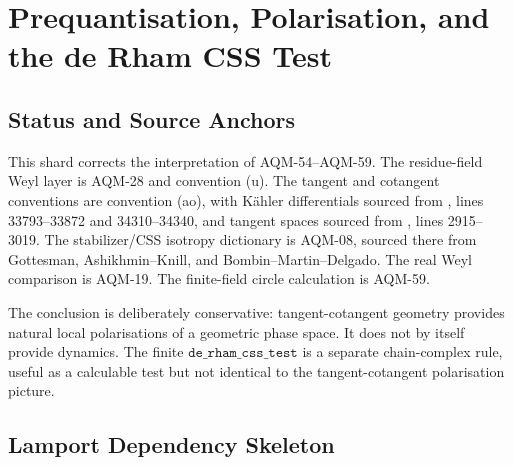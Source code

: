 
\section{Prequantisation, Polarisation, and the de Rham CSS Test}
\label{sec:prequantisation-polarisation-derham-css}

\subsection{Status and Source Anchors}

\begin{sloppypar}
This shard corrects the interpretation of AQM-54--AQM-59.  The residue-field
Weyl layer is AQM-28 and convention (u).  The tangent and cotangent conventions
are convention (ao), with K\"ahler differentials sourced from
, lines
33793--33872 and 34310--34340, and tangent spaces sourced from
, lines
2915--3019.  The stabilizer/CSS isotropy dictionary is AQM-08, sourced there
from Gottesman, Ashikhmin--Knill, and Bombin--Martin--Delgado.  The real Weyl
comparison is AQM-19.  The finite-field circle calculation is AQM-59.
\end{sloppypar}

The conclusion is deliberately conservative: tangent-cotangent geometry
provides natural local polarisations of a geometric phase space.  It does not
by itself provide dynamics.  The finite \(\texttt{de\_rham\_css\_test}\) is a
separate chain-complex rule, useful as a calculable test but not identical to
the tangent-cotangent polarisation picture.

\subsection{Lamport Dependency Skeleton}

